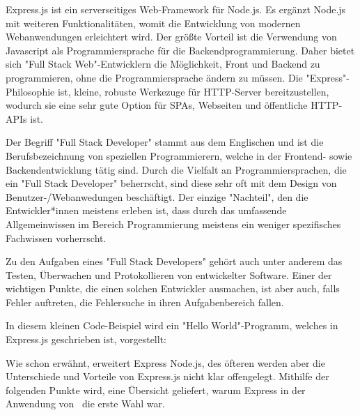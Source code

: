  \label{sec:express}

Express.js ist ein serverseitiges Web-Framework für Node.js. Es ergänzt Node.js mit weiteren Funktionalitäten, womit die Entwicklung von modernen Webanwendungen erleichtert wird. Der größte Vorteil ist die Verwendung von Javascript als Programmiersprache für die Backendprogrammierung. Daher bietet sich "Full Stack Web"-Entwicklern die Möglichkeit, Front und Backend zu programmieren, ohne die Programmiersprache ändern zu müssen. Die "Express"-Philosophie ist, kleine, robuste Werkezuge für HTTP-Server bereitzustellen, wodurch sie eine sehr gute Option für SPAs, Webseiten und öffentliche HTTP-APIs ist. \cite{Express}

Der Begriff "Full Stack Developer" stammt aus dem Englischen und ist die Berufsbezeichnung von speziellen Programmierern, welche in der Frontend- sowie Backendentwicklung tätig sind. Durch die Vielfalt an Programmiersprachen, die ein "Full Stack Developer" beherrscht, sind diese sehr oft mit dem Design von Benutzer-/Webanwedungen beschäftigt. Der einzige "Nachteil", den die Entwickler*innen meistens erleben ist, dass durch das umfassende Allgemeinwissen im Bereich Programmierung meistens ein weniger spezifisches Fachwissen vorherrscht. 

Zu den Aufgaben eines "Full Stack Developers" gehört auch unter anderem das Testen, Überwachen und Protokollieren von entwickelter Software. Einer der wichtigen Punkte, die einen solchen Entwickler ausmachen, ist aber auch, falls Fehler auftreten, die Fehlersuche in ihren Aufgabenbereich fallen. \cite{FullStack}

\pagebreak
{}

In diesem kleinen Code-Beispiel wird ein "Hello World"-Programm, welches in Express.js geschrieben ist, vorgestellt:


 \cite{Express}


Wie schon erwähnt, erweitert Express Node.js, des öfteren werden aber die Unterschiede und Vorteile von Express.js nicht klar offengelegt. Mithilfe der folgenden Punkte wird, eine Übersicht geliefert, warum Express in der Anwendung von \ZELIA\ die erste Wahl war.

